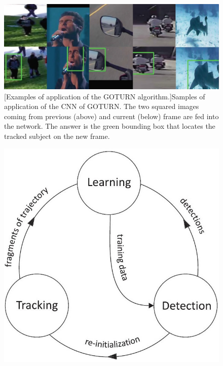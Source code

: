 \begin{figure}
	\centering
	\begin{minipage}{.65\textwidth}
		\centering
		\includegraphics[width=1\linewidth]{images/tracking/sample_GOTURN}
		\captionsetup{margin=0.5cm}
		[Examples of application of the GOTURN algorithm.]{Samples of application of the CNN of GOTURN. The two squared images coming from previous (above) and current (below) frame are fed into the network. The answer is the green bounding box that locates the tracked subject on the new frame.}
		\label{fig:sample_GOTURN}
	\end{minipage}
	\begin{minipage}{.34\textwidth}
		\centering
		\includegraphics[width=1\linewidth]{images/tracking/howItWorks_TLD}
		\label{fig:howItWorks_TLD}
	\end{minipage}
\end{figure}

